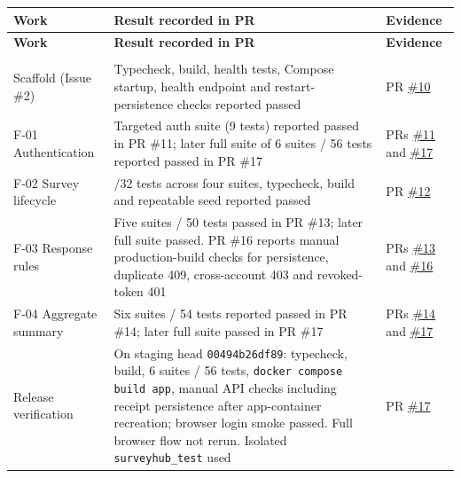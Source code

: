 \documentclass[12pt,a4paper]{article}
\begin{document}
{\setlength{\tabcolsep}{3pt}\renewcommand{\arraystretch}{1.08}\scriptsize
\begin{longtable}{@{}>{\raggedright\arraybackslash}p{}>{\raggedright\arraybackslash}p{}>{\raggedright\arraybackslash}p{}@{}}
\toprule
\textbf{Work} & \textbf{Result recorded in PR} & \textbf{Evidence} \\
\midrule
\endfirsthead
\toprule
\textbf{Work} & \textbf{Result recorded in PR} & \textbf{Evidence} \\
\midrule
\endhead
\midrule
\multicolumn{3}{r}{\footnotesize\textit{Continued on next page}}\\
\endfoot
\bottomrule
\endlastfoot
Scaffold (Issue \#2) & Typecheck, build, health tests, Compose startup, health endpoint and restart-persistence checks reported passed & PR \href{https://github.com/Snnn3/SurveyHub/pull/10}{\#10} \\
F-01 Authentication & Targeted auth suite (9 tests) reported passed in PR \#11; later full suite of 6 suites / 56 tests reported passed in PR \#17 & PRs \href{https://github.com/Snnn3/SurveyHub/pull/11}{\#11} and \href{https://github.com/Snnn3/SurveyHub/pull/17}{\#17} \\
F-02 Survey lifecycle & 32/32 tests across four suites, typecheck, build and repeatable seed reported passed & PR \href{https://github.com/Snnn3/SurveyHub/pull/12}{\#12} \\
F-03 Response rules & Five suites / 50 tests passed in PR \#13; later full suite passed. PR \#16 reports manual production-build checks for persistence, duplicate 409, cross-account 403 and revoked-token 401 & PRs \href{https://github.com/Snnn3/SurveyHub/pull/13}{\#13} and \href{https://github.com/Snnn3/SurveyHub/pull/16}{\#16} \\
F-04 Aggregate summary & Six suites / 54 tests reported passed in PR \#14; later full suite passed in PR \#17 & PRs \href{https://github.com/Snnn3/SurveyHub/pull/14}{\#14} and \href{https://github.com/Snnn3/SurveyHub/pull/17}{\#17} \\
Release verification & On staging head \texttt{00494b26df89}: typecheck, build, 6 suites / 56 tests, \texttt{docker compose build app}, manual API checks including receipt persistence after app-container recreation; browser login smoke passed. Full browser flow not rerun. Isolated \texttt{surveyhub\_test} used & PR \href{https://github.com/Snnn3/SurveyHub/pull/17}{\#17} \\
\end{longtable}}
\end{document}
